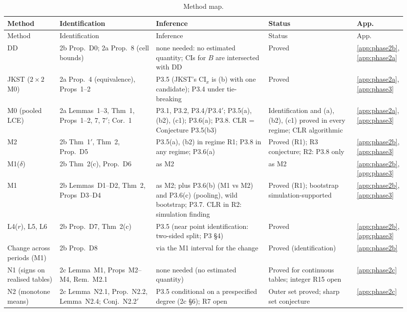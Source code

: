{\footnotesize
\setlength{\tabcolsep}{3pt}
\begin{longtable}{@{}L{0.13\linewidth}L{0.24\linewidth}L{0.29\linewidth}L{0.22\linewidth}L{0.07\linewidth}@{}}
\caption{Method map.}\label{tab:methodmap}\\
\toprule Method & Identification & Inference & Status & App. \\ \midrule\endfirsthead
\toprule Method & Identification & Inference & Status & App. \\ \midrule\endhead
DD & 2b Prop.~D0; 2a Prop.~8 (cell bounds) & none needed: no estimated quantity; CIs for $B$ are intersected with DD & Proved & \ref{app:phase2b}, \ref{app:phase2a} \\
JKST ($2\times2$ M0) & 2a Prop.~4 (equivalence), Props~1--2 & P3.5 (JKST's $\mathrm{CI}_x$ is (b) with one candidate); P3.4 under tie-breaking & Proved & \ref{app:phase2a}, \ref{app:phase3} \\
M0 (pooled LCE) & 2a Lemmas~1--3, Thm~1, Props~1--2, 7, 7$'$; Cor.~1 & P3.1, P3.2, P3.4/P3.4$'$; P3.5(a), (b2), (c1); P3.6(a); P3.8. CLR = Conjecture P3.5(b3) & Identification and (a), (b2), (c1) proved in every regime; CLR algorithmic & \ref{app:phase2a}, \ref{app:phase3} \\
M2 & 2b Thm~1$'$, Thm~2, Prop.~D5 & P3.5(a), (b2) in regime R1; P3.8 in any regime; P3.6(a) & Proved (R1); R3 conjecture; R2: P3.8 only & \ref{app:phase2b}, \ref{app:phase3} \\
M1($\delta$) & 2b Thm~2(c), Prop.~D6 & as M2 & as M2 & \ref{app:phase2b}, \ref{app:phase3} \\
M1 & 2b Lemmas~D1--D2, Thm~2, Props~D3--D4 & as M2; plus P3.6(b) (M1 vs M2) and P3.6(c) (pooling), wild bootstrap; P3.7. CLR in R2: simulation finding & Proved (R1); bootstrap simulation-supported & \ref{app:phase2b}, \ref{app:phase3} \\
L4($r$), L5, L6 & 2b Prop.~D7, Thm~2(c) & P3.5 (near point identification: two-sided split; P3 \S4) & Proved & \ref{app:phase2b}, \ref{app:phase3} \\
Change across periods (M1) & 2b Prop.~D8 & via the M1 interval for the change & Proved (identification) & \ref{app:phase2b} \\
N1 (signs on realised tables) & 2c Lemma~M1, Props~M2--M4, Rem.~M2.1 & none needed (no estimated quantity) & Proved for continuous tables; integer R15 open & \ref{app:phase2c} \\
N2 (monotone means) & 2c Lemma~N2.1, Prop.~N2.2, Lemma~N2.4; Conj.~N2.2$'$ & P3.5 conditional on a prespecified degree (2c \S6); R7 open & Outer set proved; sharp set conjecture & \ref{app:phase2c} \\

\end{longtable}}
